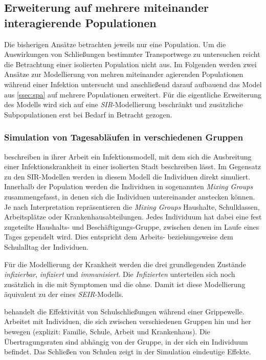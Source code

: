 \subsection{Erweiterung auf mehrere miteinander interagierende Populationen}\label{ssec:multiPop}
\steffen
Die bisherigen Ansätze betrachten jeweils nur eine Population. Um die Auswirkungen von Schließungen bestimmter Transportwege zu untersuchen reicht die Betrachtung einer isolierten Population nicht aus. Im Folgenden werden zwei Ansätze zur Modellierung von mehren miteinander agierenden Populationen während einer Infektion untersucht und anschließend darauf aufbauend das Model aus \ref{ssec:spa} auf mehrere Populationen erweitert. Für die eigentliche Erweiterung des Modells wird sich auf eine \emph{SIR}-Modellierung beschränkt und zusätzliche Subpopulationen erst bei Bedarf in Betracht gezogen.
\subsubsection{Simulation von Tagesabläufen in verschiedenen Gruppen}
\cite{Capasso1978} beschreiben in ihrer Arbeit ein Infektionsmodell, mit dem sich die Ausbreitung einer Infektionskrankheit in einer isolierten Stadt beschreiben lässt. Im Gegensatz zu den SIR-Modellen werden in diesem Modell die Individuen direkt simuliert. Innerhalb der Population werden die Individuen in sogenannten \emph{Mixing Groups} zusammengefasst, in denen sich die Individuen untereinander anstecken können. Je nach Interpretation repräsentieren die \emph{Mixing Groups} Haushalte, Schulklassen, Arbeitsplätze oder Krankenhausabteilungen. Jedes Individuum hat dabei eine fest zugeteilte Haushalts- und Beschäftigungs-Gruppe, zwischen denen im Laufe eines Tages gependelt wird. Dies entspricht dem Arbeits- beziehungsweise dem Schulalltag der Individuen.

Für die Modellierung der Krankheit werden die drei grundlegenden Zustände \emph{infizierbar}, \emph{infiziert} und \emph{immunisiert}. Die \emph{Infizierten} unterteilen sich noch zusätzlich in die mit Symptomen und die ohne. Damit ist diese Modellierung äquivalent zu der eines \emph{SEIR}-Modells.


behandelt die Effektivität von Schulschließungen während einer Grippewelle. Arbeitet mit Individuen, die sich zwischen verschiedenen Gruppen hin und her bewegen (explizit: Familie, Schule, Arbeit und Krankenhaus). Die Übertragungsraten sind abhängig von der Gruppe, in der sich ein Individuum befindet. Das Schließen von Schulen zeigt in der Simulation eindeutige Effekte.
